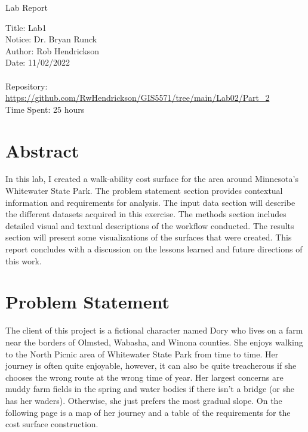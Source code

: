 \documentclass[article,12pt]{article}
\numberwithin{equation}{section}
\begin{document}
\begin{center}
Lab Report

Title: Lab1\\
Notice: Dr. Bryan Runck\\
Author: Rob Hendrickson\\
Date: 11/02/2022\\~\\

Repository: \url{https://github.com/RwHendrickson/GIS5571/tree/main/Lab02/Part_2}\\
Time Spent: 25 hours

\end{center}

\section*{Abstract}
In this lab, I created a walk-ability cost surface for the area around Minnesota's Whitewater State Park. The problem statement section provides contextual information and requirements for analysis. The input data section will describe the different datasets acquired in this exercise. The methods section includes detailed visual and textual descriptions of the workflow conducted. The results section will present some visualizations of the surfaces that were created. This report concludes with a discussion on the lessons learned and future directions of this work.


\section{Problem Statement}
The client of this project is a fictional character named Dory who lives on a farm near the borders of Olmsted, Wabasha, and Winona counties. She enjoys walking to the North Picnic area of Whitewater State Park from time to time. Her journey is often quite enjoyable, however, it can also be quite treacherous if she chooses the wrong route at the wrong time of year. Her largest concerns are muddy farm fields in the spring and water bodies if there isn't a bridge (or she has her waders). Otherwise, she just prefers the most gradual slope. On the following page is a map of her journey and a table of the requirements for the cost surface construction.
\end{document}
